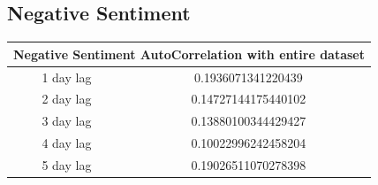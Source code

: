 \subsection{Negative Sentiment}

\begin{center}
\begin{tabular}{ c c }
\hline
\multicolumn{2}{|c|}{Negative Sentiment AutoCorrelation with entire dataset} \\
\hline
1 day lag & 0.1936071341220439 \\
2 day lag & 0.14727144175440102 \\
3 day lag & 0.13880100344429427 \\
4 day lag & 0.10022996242458204 \\
5 day lag & 0.19026511070278398
\end{tabular}
\end{center}